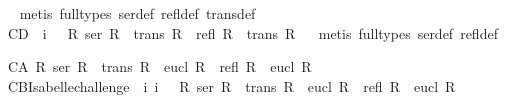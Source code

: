 \begin{isabellebody}
%
\isadelimproof
\ %
\endisadelimproof
%
\isatagproof
{}\isamarkupfalse%
\ {\isacharparenleft}metis\ {\isacharparenleft}full{\isacharunderscore}types{\isacharparenright}\ ser{\isacharunderscore}def\ refl{\isacharunderscore}def\ trans{\isacharunderscore}def{\isacharparenright}%
\endisatagproof
{\isafoldproof}%
%
\isadelimproof
\isanewline
%
\endisadelimproof
{}\isamarkupfalse%
\ C{}{}{\isacharunderscore}D{\isacharcolon}\ {\isachardoublequoteopen}{\isacharhash}\ i{}\ \ {\isasymlongrightarrow}\ {\isacharparenleft}{\isasymforall}R{\isachardot}\ ser\ R\ {\isasymand}\ trans\ R\ {\isasymlongrightarrow}\ {\isacharparenleft}refl\ R\ {\isasymand}\ trans\ R{\isacharparenright}{\isacharparenright}{\isachardoublequoteclose}\isanewline
%
\isadelimproof
\ %
\endisadelimproof
%
\isatagproof
{}\isamarkupfalse%
\ {\isacharparenleft}metis\ {\isacharparenleft}full{\isacharunderscore}types{\isacharparenright}\ ser{\isacharunderscore}def\ refl{\isacharunderscore}def{\isacharparenright}%
\endisatagproof
{\isafoldproof}%
%
\isadelimproof
%
\endisadelimproof
%
\begin{isamarkuptext}%
\begin{isbfig}{7em}
\end{isbfig}%
\end{isamarkuptext}%
\isamarkuptrue%
%
\isamarkuptrue%
\isamarkupfalse%
\ C{}{}{\isacharunderscore}A{\isacharcolon}\ {\isachardoublequoteopen}{\isasymforall}R{\isachardot}\ ser\ R\ {\isasymand}\ trans\ R\ {\isasymand}\ eucl\ R\ {\isasymlongrightarrow}\ {\isacharparenleft}refl\ R\ {\isasymand}\ eucl\ R{\isacharparenright}{\isachardoublequoteclose}\ \isanewline
\ \isamarkupfalse%
%
\isadelimproof
\ %
\endisadelimproof
%
\isatagproof
{}\isamarkupfalse%
%
\endisatagproof
{\isafoldproof}%
%
\isadelimproof
%
\endisadelimproof
\isanewline
\isanewline
{}\isamarkupfalse%
\ C{}{}{\isacharunderscore}B{\isacharunderscore}Isabelle{\isacharunderscore}challenge{\isacharcolon}\ {\isachardoublequoteopen}{\isacharhash}\ i{}\ i{}\ {\isasymlongrightarrow}\ {\isasymnot}\ {\isacharparenleft}{\isasymforall}R{\isachardot}\ ser\ R\ {\isasymand}\ trans\ R\ {\isasymand}\ eucl\ R\ {\isasymlongrightarrow}\ {\isacharparenleft}refl\ R\ {\isasymand}\ eucl\ R{\isacharparenright}{\isacharparenright}{\isachardoublequoteclose}\isanewline

\end{isabellebody}

